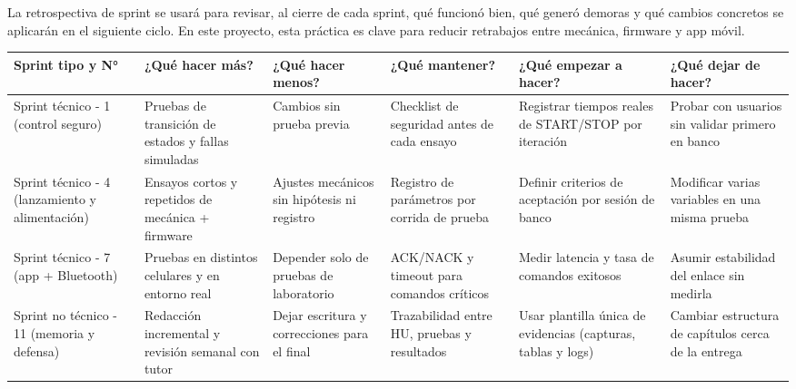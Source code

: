 ﻿\documentclass[
11pt, %
]{charter}
\begin{document}
La retrospectiva de sprint se usará para revisar, al cierre de cada sprint, qué funcionó bien, qué generó demoras y qué cambios concretos se aplicarán en el siguiente ciclo. En este proyecto, esta práctica es clave para reducir retrabajos entre mecánica, firmware y app móvil.


\begin{table}[htpb]
\small
\renewcommand{\arraystretch}{1.3}
\begin{tabular}{|>{\raggedright\arraybackslash}p{1.9cm}|
                >{\raggedright\arraybackslash}p{2.3cm}|
                >{\raggedright\arraybackslash}p{2.3cm}|
                >{\raggedright\arraybackslash}p{2.3cm}|
                >{\raggedright\arraybackslash}p{2.3cm}|
                >{\raggedright\arraybackslash}p{2.3cm}|}
\hline
\rowcolor[HTML]{CCCCCC} 
\textbf{Sprint tipo y N°} & \textbf{¿Qué hacer más?} & \textbf{¿Qué hacer menos?} & \textbf{¿Qué mantener?} & \textbf{¿Qué empezar a hacer?} & \textbf{¿Qué dejar de hacer?} \\
\hline
Sprint técnico - 1 (control seguro) & Pruebas de transición de estados y fallas simuladas & Cambios sin prueba previa & Checklist de seguridad antes de cada ensayo & Registrar tiempos reales de START/STOP por iteración & Probar con usuarios sin validar primero en banco \\
\hline
Sprint técnico - 4 (lanzamiento y alimentación) & Ensayos cortos y repetidos de mecánica + firmware & Ajustes mecánicos sin hipótesis ni registro & Registro de parámetros por corrida de prueba & Definir criterios de aceptación por sesión de banco & Modificar varias variables en una misma prueba \\
\hline
Sprint técnico - 7 (app + Bluetooth) & Pruebas en distintos celulares y en entorno real & Depender solo de pruebas de laboratorio & ACK/NACK y timeout para comandos críticos & Medir latencia y tasa de comandos exitosos & Asumir estabilidad del enlace sin medirla \\
\hline
Sprint no técnico - 11 (memoria y defensa) & Redacción incremental y revisión semanal con tutor & Dejar escritura y correcciones para el final & Trazabilidad entre HU, pruebas y resultados & Usar plantilla única de evidencias (capturas, tablas y logs) & Cambiar estructura de capítulos cerca de la entrega \\
\hline
\end{tabular}
\end{table}
\end{document}
